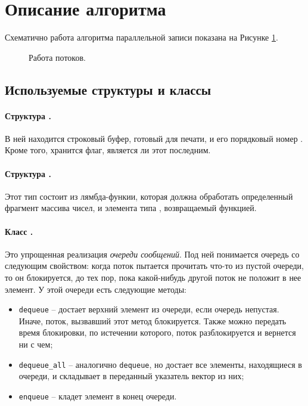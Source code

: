 \section{Описание алгоритма} \label{sec1}
Схематично работа алгоритма параллельной записи показана на Рисунке \ref{draw}.
\begin{figure}[h!]
\begin{footnotesize}
\def\svgwidth{430pt}
  
  \caption{Работа потоков.} \label{draw}
\end{footnotesize}\end{figure}

\subsection{Используемые структуры и классы}
\paragraph{Структура \texttt{}.}
В ней находится строковый буфер, готовый для печати, и его порядковый номер \texttt{}.
Кроме того, хранится флаг, является ли этот \texttt{} последним.
\paragraph{Структура \texttt{}.}
Этот тип состоит из лямбда-функии, которая должна обработать определенный фрагмент массива чисел, и элемента типа \texttt{}, возвращаемый функцией.
\paragraph{Класс \texttt{}.}
Это упрощенная реализация \textit{очереди сообщений}.  
Под ней понимается очередь со следующим свойством: когда поток пытается прочитать что-то из пустой очереди, то он блокируется, до тех пор, пока какой-нибудь другой поток не положит в нее элемент.
У этой очереди есть следующие методы:
\begin{itemize}
\item \texttt{dequeue} -- достает верхний элемент из очереди, если очередь непустая.
Иначе, поток, вызвавший этот метод блокируется. Также можно передать время блокировки, по истечении которого, поток разблокируется и вернется ни с чем;
\item \texttt{dequeue\_all} -- аналогично \texttt{dequeue}, но достает все элементы, находящиеся в очереди, и складывает в переданный указатель вектор из них;
\item \texttt{enqueue} -- кладет элемент в конец очереди.
\end{itemize}
